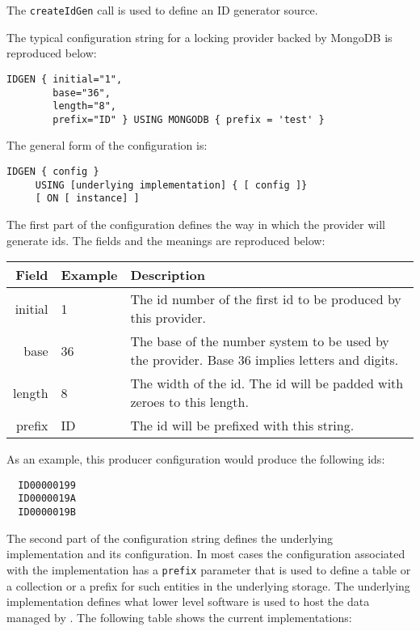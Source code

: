 The \verb+createIdGen+ call is used to define an ID generator source.

The typical configuration string for a locking provider backed by MongoDB is reproduced below:

\begin{Verbatim}
IDGEN { initial="1",
        base="36",
        length="8",
        prefix="ID" } USING MONGODB { prefix = 'test' }
\end{Verbatim}

The general form of the configuration is:

\begin{Verbatim}
IDGEN { config }
     USING [underlying implementation] { [ config ]}
     [ ON [ instance] ]
\end{Verbatim}

The first part of the configuration defines the way in which the provider will generate ids. The fields
and the meanings are reproduced below:

\begin{table}[h]
\begin{center}
\begin{tabular}{r l p{8cm}}
  Field & Example & Description \\
  \hline
  initial & 1 & The id number of the first id to be produced by this provider. \\
  base & 36 & The base of the number system to be used by the provider. Base 36 implies letters and digits. \\
  length & 8 & The width of the id. The id will be padded with zeroes to this length. \\
  prefix & ID & The id will be prefixed with this string. \\
\end{tabular}
\end{center}
\end{table}

As an example, this producer configuration would produce the following ids:

\begin{Verbatim}
  ID00000199
  ID0000019A
  ID0000019B
\end{Verbatim}

The second part of the configuration string defines the underlying implementation and its configuration. In
most cases the configuration associated with the implementation has a \verb+prefix+ parameter that is used to
define a table or a collection or a prefix for such entities in the underlying storage. The underlying implementation
defines what lower level software is used to host the data managed by \Rapture. The following table shows the current
implementations:

